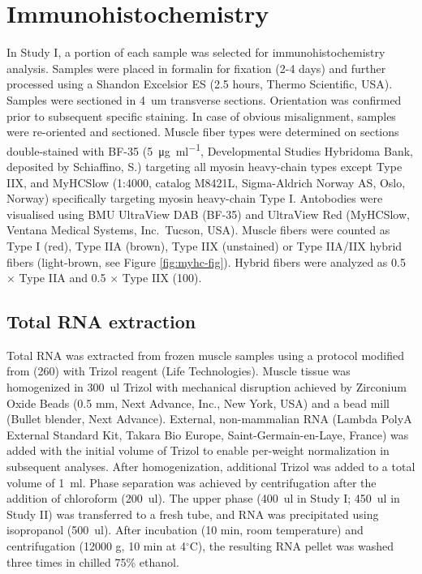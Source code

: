 \documentclass[twoside,10pt]{gihclass} %
\begin{document}
\hypertarget{immunohistochemistry}{%
\section{Immunohistochemistry}\label{immunohistochemistry}}

In Study I, a portion of each sample was selected for immunohistochemistry analysis. Samples were placed in formalin for fixation (2-4 days) and further processed using a Shandon Excelsior ES (2.5 hours, Thermo Scientific, USA). Samples were sectioned in \SI{4}{um} transverse sections. Orientation was confirmed prior to subsequent specific staining. In case of obvious misalignment, samples were re-oriented and sectioned. Muscle fiber types were determined on sections double-stained with BF-35 (\SI{5}{\micro\gram\per\milli\litre}, Developmental Studies Hybridoma Bank, deposited by Schiaffino, S.) targeting all myosin heavy-chain types except Type IIX, and MyHCSlow (1:4000, catalog M8421L, Sigma-Aldrich Norway AS, Oslo, Norway) specifically targeting myosin heavy-chain Type I.
Antobodies were visualised using BMU UltraView DAB (BF-35) and UltraView Red (MyHCSlow, Ventana Medical Systems, Inc.~Tucson, USA).
Muscle fibers were counted as Type I (red), Type IIA (brown), Type IIX (unstained) or Type IIA/IIX hybrid fibers (light-brown, see Figure \ref{fig:myhc-fig}). Hybrid fibers were analyzed as 0.5 \(\times\) Type IIA and 0.5 \(\times\) Type IIX
(100).

\hypertarget{total-rna-extraction}{%
\subsection{Total RNA extraction}\label{total-rna-extraction}}

Total RNA was extracted from frozen muscle samples using a protocol modified from
(260)
with Trizol reagent (Life Technologies).
Muscle tissue was homogenized in \SI{300}{ul} Trizol with mechanical disruption achieved by Zirconium Oxide Beads (0.5 mm, Next Advance, Inc., New York, USA) and a bead mill (Bullet blender, Next Advance). External, non-mammalian RNA (Lambda PolyA External Standard Kit, Takara Bio Europe, Saint-Germain-en-Laye, France) was added with the initial volume of Trizol to enable per-weight normalization in subsequent analyses. After homogenization, additional Trizol was added to a total volume of \SI{1}{ml}. Phase separation was achieved by centrifugation after the addition of chloroform (\SI{200}{ul}). The upper phase (\SI{400}{ul} in Study I; \SI{450}{ul} in Study II) was transferred to a fresh tube, and RNA was precipitated using isopropanol (\SI{500}{ul}). After incubation (10 min, room temperature) and centrifugation (12000 g, 10 min at 4\(^{\circ}\)C), the resulting RNA pellet was washed three times in chilled 75\% ethanol.
\end{document}
